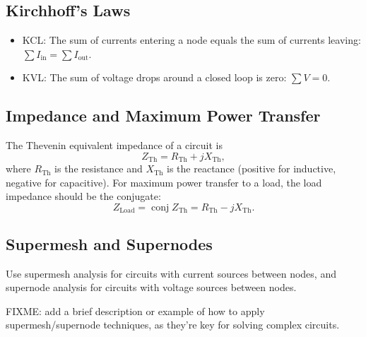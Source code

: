 \documentclass[letterpaper]{scrartcl}
\DeclareMathOperator{\conj}{conj}
\newcommand{\thev}[0]{\mathrm{Th}}
\newcommand{\load}[0]{\mathrm{Load}}
\begin{document}
\subsection*{Kirchhoff's Laws}
\begin{itemize}
\item KCL: The sum of currents entering a node equals the sum of currents leaving: \(\sum I_{\text{in}} = \sum I_{\text{out}}\).
\item KVL: The sum of voltage drops around a closed loop is zero: \(\sum V = 0\).
\end{itemize}

\subsection*{Impedance and Maximum Power Transfer}
The Thevenin equivalent impedance of a circuit is
\begin{equation}\label{eqn:karlCircuitsCheatSheet:340}
Z_\thev = R_\thev + j X_\thev,
\end{equation}
where \( R_\thev \) is the resistance and \( X_\thev \) is the reactance (positive for inductive, negative for capacitive). For maximum power transfer to a load, the load impedance should be the conjugate:
\begin{equation}\label{eqn:karlCircuitsCheatSheet:360}
Z_\load = \conj{Z_\thev} = R_\thev - j X_\thev.
\end{equation}

\subsection*{Supermesh and Supernodes}
Use supermesh analysis for circuits with current sources between nodes, and supernode analysis for circuits with voltage sources between nodes.

FIXME: add a brief description or example of how to apply supermesh/supernode techniques, as they’re key for solving complex circuits.
\end{document}
